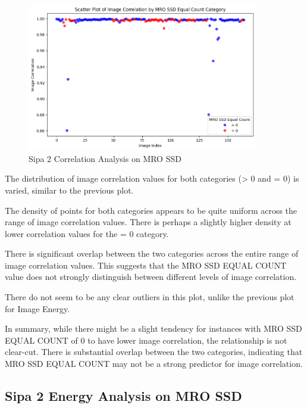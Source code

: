 \begin{figure}[ht]
    \centering
    \includegraphics[width=0.9\textwidth]{Figures/Results/sipa_02/correlation.png}
    \caption[Sipa 2 Correlation Analysis on MRO SSD]{Sipa 2 Correlation Analysis on MRO SSD}
    \label{fig:Sipa 2 Correlation Analysis on MRO SSD}
\end{figure}

The distribution of image correlation values for both categories (> 0 and = 0) is varied, similar to the previous plot.

The density of points for both categories appears to be quite uniform across the range of image correlation values. There is perhaps a slightly higher density at lower correlation values for the = 0 category.

There is significant overlap between the two categories across the entire range of image correlation values. This suggests that the MRO SSD EQUAL COUNT value does not strongly distinguish between different levels of image correlation.

There do not seem to be any clear outliers in this plot, unlike the previous plot for Image Energy.

In summary, while there might be a slight tendency for instances with MRO SSD EQUAL COUNT of 0 to have lower image correlation, the relationship is not clear-cut. There is substantial overlap between the two categories, indicating that MRO SSD EQUAL COUNT may not be a strong predictor for image correlation.

\newpage

\subsection{Sipa 2 Energy Analysis on MRO SSD}


